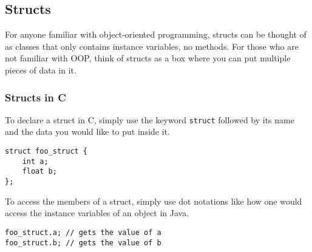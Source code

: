 \subsection{Structs}

For anyone familiar with object-oriented programming, structs 
can be thought of as classes that only contains instance variables,
no methods. For those who are not familiar with OOP, think of
structs as a box where you can put multiple pieces of data in it.

\subsubsection{Structs in C}

To declare a struct in C, simply use the keyword \texttt{struct}
followed by its name and the data you would like to put inside it.

\begin{verbatim}
struct foo_struct {
    int a;
    float b;
};
\end{verbatim}

To access the members of a struct, simply use dot notations like 
how one would access the instance variables of an object in Java.

\begin{verbatim}
foo_struct.a; // gets the value of a
foo_struct.b; // gets the value of b
\end{verbatim}